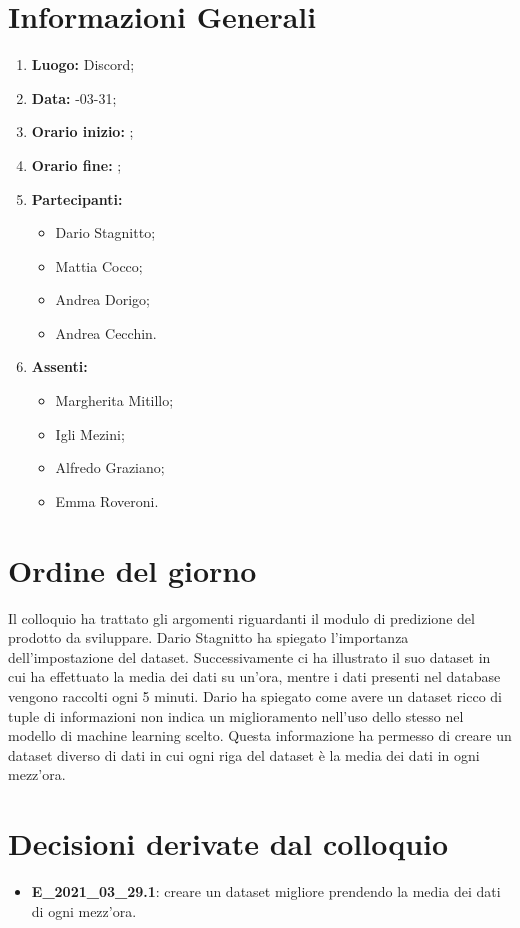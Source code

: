 \newpage
\section{Informazioni Generali}
\begin{enumerate}
	\item \textbf{Luogo:} \normalfont Discord;
	\item \textbf{Data:} -03-31;
	\item \textbf{Orario inizio:} ;
	\item \textbf{Orario fine:} ;
	\item \textbf{Partecipanti:}
	\begin{itemize}
		\item Dario Stagnitto;
		\item Mattia Cocco;
		\item Andrea Dorigo;
		\item Andrea Cecchin.
	\end{itemize}
	\item \textbf{Assenti:}
	\begin{itemize}
		\item Margherita Mitillo;
		\item Igli Mezini;
		\item Alfredo Graziano;
		\item Emma Roveroni.
	\end{itemize}
\end{enumerate}
\section{Ordine del giorno}
Il colloquio ha trattato gli argomenti riguardanti il modulo di predizione del prodotto da sviluppare. Dario Stagnitto ha spiegato l'importanza dell'impostazione del dataset. Successivamente ci ha illustrato il suo dataset in cui ha effettuato la media dei dati su un'ora, mentre i dati presenti nel database vengono raccolti ogni 5 minuti. Dario ha spiegato come avere un dataset ricco di tuple di informazioni non indica un miglioramento nell'uso dello stesso nel modello di machine learning scelto. Questa informazione ha permesso di creare un dataset diverso di dati in cui ogni riga del dataset è la media dei dati in ogni mezz'ora.
\section{Decisioni derivate dal colloquio}
\begin{itemize}
	\item \textbf{E\_2021\_03\_29.1}: creare un dataset migliore prendendo la media dei dati di ogni mezz'ora.
\end{itemize}
